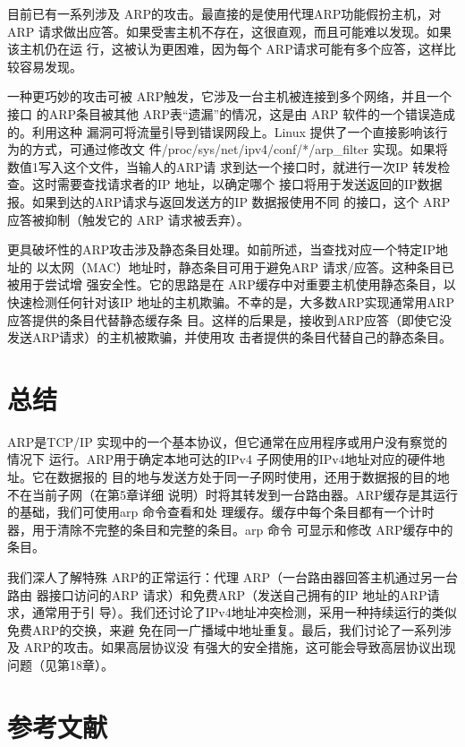 目前已有一系列涉及 ARP的攻击。最直接的是使用代理ARP功能假扮主机，对ARP
请求做出应答。如果受害主机不存在，这很直观，而且可能难以发现。如果该主机仍在运
行，这被认为更困难，因为每个 ARP请求可能有多个应答，这样比较容易发现。

一种更巧妙的攻击可被 ARP触发，它涉及一台主机被连接到多个网络，并且一个接口
的ARP条目被其他 ARP表“遗漏”的情况，这是由 ARP 软件的一个错误造成的。利用这种
漏洞可将流量引导到错误网段上。Linux 提供了一个直接影响该行为的方式，可通过修改文
件/proc/sys/net/ipv4/conf/*/arp\_filter 实现。如果将数值1写入这个文件，当输人的ARP请
求到达一个接口时，就进行一次IP 转发检查。这时需要查找请求者的IP 地址，以确定哪个
接口将用于发送返回的IP数据报。如果到达的ARP请求与返回发送方的IP 数据报使用不同
的接口，这个 ARP应答被抑制（触发它的 ARP 请求被丢弃）。

更具破坏性的ARP攻击涉及静态条目处理。如前所述，当查找对应一个特定IP地址的
以太网（MAC）地址时，静态条目可用于避免ARP 请求/应答。这种条目已被用于尝试增
强安全性。它的思路是在 ARP缓存中对重要主机使用静态条目，以快速检测任何针对该IP
地址的主机欺骗。不幸的是，大多数ARP实现通常用ARP应答提供的条目代替静态缓存条
目。这样的后果是，接收到ARP应答（即使它没发送ARP请求）的主机被欺骗，并使用攻
击者提供的条目代替自己的静态条目。

\section{总结}

ARP是TCP/IP 实现中的一个基本协议，但它通常在应用程序或用户没有察觉的情况下
运行。ARP用于确定本地可达的IPv4 子网使用的IPv4地址对应的硬件地址。它在数据报的
目的地与发送方处于同一子网时使用，还用于数据报的目的地不在当前子网（在第5章详细
说明）时将其转发到一台路由器。ARP缓存是其运行的基础，我们可使用arp 命令查看和处
理缓存。缓存中每个条目都有一个计时器，用于清除不完整的条目和完整的条目。arp 命令
可显示和修改 ARP缓存中的条目。

我们深人了解特殊 ARP的正常运行：代理 ARP（一台路由器回答主机通过另一台路由
器接口访问的ARP 请求）和免费ARP（发送自己拥有的IP 地址的ARP请求，通常用于引
导）。我们还讨论了IPv4地址冲突检测，采用一种持续运行的类似免费ARP的交换，来避
免在同一广播域中地址重复。最后，我们讨论了一系列涉及 ARP的攻击。如果高层协议没
有强大的安全措施，这可能会导致高层协议出现问题（见第18章）。

\section{参考文献}
